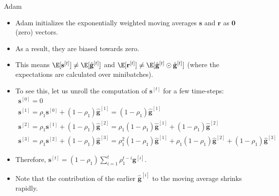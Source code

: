 \begin{vbframe}{Adam}
\begin{algorithm}[H]
\begin{algorithmic}[1]
    \EndWhile
  \end{algorithmic}
\end{algorithm}


\framebreak


\begin{itemize}
  \item Adam initializes the exponentially weighted moving averages $\mathbf{s}$ and $\mathbf{r}$ as $\mathbf{0}$ (zero) vectors.
  \item As a result, they are biased towards zero. 
  \item This means $\E[\mathbf{s}^{[t]}] \neq \E [\hat{\mathbf{g}}^{[t]}]$ and $\E[\mathbf{r}^{[t]}] \neq \E [\hat{\mathbf{g}}^{[t]} \odot \hat{\mathbf{g}}^{[t]}]$ (where the expectations are calculated over minibatches).
  \item To see this, let us unroll the computation of $\mathbf{s}^{[t]}$ for a few time-steps:
        \footnotesize
        \begin{gather*}
          \mathbf{s}^{[0]} = 0 \\
          \mathbf{s}^{[1]} = \rho_1\mathbf{s}^{[0]} + (1 - \rho_1) \hat{\mathbf{g}}^{[1]} = (1 - \rho_1) \hat{\mathbf{g}}^{[1]} \\
          \mathbf{s}^{[2]} = \rho_1\mathbf{s}^{[1]} + (1 - \rho_1) \hat{\mathbf{g}}^{[2]} = \rho_1 (1 - \rho_1) \hat{\mathbf{g}}^{[1]} + (1 - \rho_1) \hat{\mathbf{g}}^{[2]} \\
          \mathbf{s}^{[3]} = \rho_1\mathbf{s}^{[2]} + (1 - \rho_1) \hat{\mathbf{g}}^{[3]} = \rho_1^2 (1 - \rho_1) \hat{\mathbf{g}}^{[1]} + \rho_1 (1 - \rho_1) \hat{\mathbf{g}}^{[2]} + (1 - \rho_1) \hat{\mathbf{g}}^{[3]}
        \end{gather*}
        \normalsize
  \item Therefore, $\mathbf{s}^{[t]}  = (1 - \rho_1) \sum_{i=1}^t \rho_1^{t - i} \mathbf{g}^{[i]}$.
    \item Note that the contribution of the earlier $\hat{\mathbf{g}}^{[i]}$ to the moving average shrinks rapidly.
  \end{itemize}
  
  \framebreak
  

\end{vbframe}
